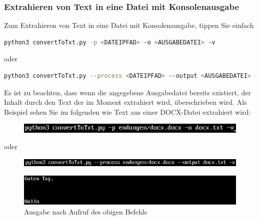\documentclass[12pt]{scrartcl}
\begin{document}
\subsubsection{Extrahieren von Text in eine Datei mit Konsolenausgabe}
\label{sec:first-steps-extraction-file-with}
Zum Extrahieren von Text in eine Datei mit Konsolenausgabe, tippen Sie einfach 
\begin{lstlisting}[language=bash]
python3 convertToTxt.py -p <DATEIPFAD> -o <AUSGABEDATEI> -v
\end{lstlisting}
\begin{center}
oder
\end{center}
\begin{lstlisting}[language=bash] 
python3 convertToTxt.py --process <DATEIPFAD> --output <AUSGABEDATEI> -v
\end{lstlisting}
Es ist zu beachten, dass wenn die angegebene Ausgabedatei bereits existiert, der Inhalt durch den Text der im Moment extrahiert wird, überschrieben wird.
 Als Beispiel sehen Sie im folgenden wie Text aus einer DOCX-Datei extrahiert wird:
\begin{figure}[htbp]
\includegraphics[width=1.0\textwidth]{ersteSchritteExtractIntoFileWithConsole001}\par\vspace{0.25cm}
\label{fig:ersteSchritteExtractIntoFileWithConsole001}
\end{figure}
\begin{center}
oder
\end{center}
\begin{figure}[htbp]
\includegraphics[width=1.0\textwidth]{ersteSchritteExtractIntoFileWithConsole002}\par

\vspace{0.25cm}
\label{fig:ersteSchritteExtractIntoFileWithConsole002}
\end{figure}
\begin{figure}[htbp]
\centering
\includegraphics[width=1.0\textwidth]{ersteSchritteExtractIntoFileWithConsole003}\par\vspace{0.25cm}
\caption{Ausgabe nach Aufruf des obigen Befehls}
\end{figure}
\newpage
\end{document}
